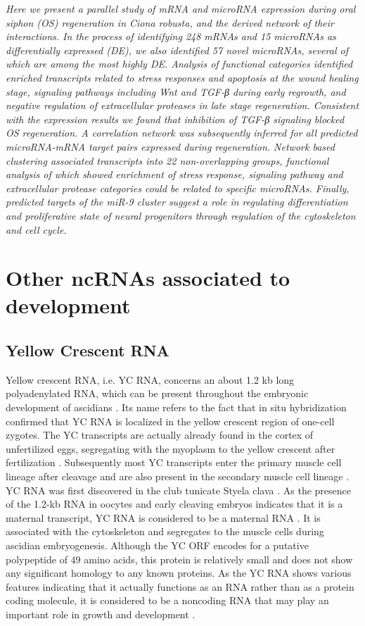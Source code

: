 \documentclass[graybox]{svmult}
\begin{document}
\cite{Spina2017}
\textit{Here we present a parallel study of mRNA and microRNA expression during 
oral siphon (OS) regeneration in Ciona robusta, and the derived network of their 
interactions. In the process of identifying 248 mRNAs and 15 microRNAs as 
differentially expressed (DE), we also identified 57 novel microRNAs, several of 
which are among the most highly DE. Analysis of functional categories identified 
enriched transcripts related to stress responses and apoptosis at the wound 
healing stage, signaling pathways including Wnt and TGF-β during early regrowth, 
and negative regulation of extracellular proteases in late stage regeneration. 
Consistent with the expression results we found that inhibition of TGF-β 
signaling blocked OS regeneration. A correlation network was subsequently 
inferred for all predicted microRNA-mRNA target pairs expressed during 
regeneration. Network based clustering associated transcripts into 22 
non-overlapping groups, functional analysis of which showed enrichment of stress 
response, signaling pathway and extracellular protease categories could be 
related to specific microRNAs. Finally, predicted targets of the miR-9 cluster 
suggest a role in regulating differentiation and proliferative state of neural 
progenitors through regulation of the cytoskeleton and cell cycle.}

\section{Other ncRNAs associated to development}
\label{sec:4}

\subsection{Yellow Crescent RNA}

Yellow crescent RNA, i.e. YC RNA, concerns an about 1.2 kb long polyadenylated 
RNA, which can be present throughout the embryonic development of ascidians 
\cite{Swalla1995}. Its name refers to the fact that in situ hybridization 
confirmed that YC RNA is localized in the yellow crescent region of one-cell 
zygotes. The YC transcripts are actually already found in the cortex of 
unfertilized eggs, segregating with the myoplasm to the yellow crescent after 
fertilization \cite{Swalla1995}. Subsequently most YC transcripts enter the 
primary muscle cell lineage after cleavage and are also present in the 
secondary muscle cell lineage \cite{Swalla1995}. YC RNA was first 
discovered in the club tunicate Styela clava \cite{Swalla1995}. As the presence 
of the 1.2-kb RNA in oocytes and early cleaving embryos indicates that it is a 
maternal transcript, YC RNA is considered to be a maternal RNA 
\cite{Swalla1995}. It is associated with the cytoskeleton and segregates to 
the muscle cells during ascidian embryogenesis. Although the YC ORF encodes for 
a putative polypeptide of $49$ amino acids, this protein is relatively small 
and does not show any significant homology to any known proteins. As the YC RNA 
shows various features indicating that it actually functions as an RNA rather 
than as a protein coding molecule, it is considered to be a noncoding RNA that 
may play an important role in growth and development \cite{Swalla1995}.
\end{document}
